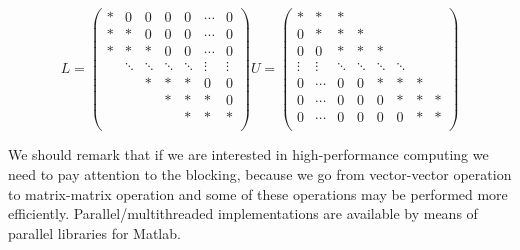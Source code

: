 \documentclass[ComputationalMathematics.tex]{subfiles}
\begin{document}
\[
L = \begin{pmatrix}
  \ast & 0 & 0 & 0 & 0 & \cdots & 0\\
  \ast & \ast & 0 & 0 & 0 & \cdots & 0\\
  \ast & \ast & \ast & 0 & 0 & \cdots & 0\\
  & \ddots & \ddots & \ddots & \ddots & \vdots & \vdots\\
  & & \ast & \ast & \ast & 0 & 0\\
  & & & \ast & \ast & \ast & 0\\
  & & & & \ast & \ast & \ast\\
\end{pmatrix}
U = \begin{pmatrix}
  \ast & \ast & \ast & & & & & \\
  0 & \ast & \ast & \ast & & & \\
  0 & 0 & \ast & \ast & \ast & & & \\
  \vdots & \vdots & \ddots & \ddots & \ddots & \ddots & \\
  0 & \cdots & 0 & 0 & \ast & \ast & \ast & \\
  0 & \cdots & 0 & 0 & 0 & \ast & \ast & \ast\\
  0 & \cdots & 0 & 0 & 0 & 0 & \ast & \ast\\
\end{pmatrix}
\]

\begin{obs}
We should remark that if we are interested in high-performance computing we need to pay attention to the blocking, because we go from vector-vector operation to matrix-matrix operation and some of these operations may be performed more efficiently. Parallel/multithreaded implementations are available by means of parallel libraries for Matlab.
\end{obs}

\end{document}
